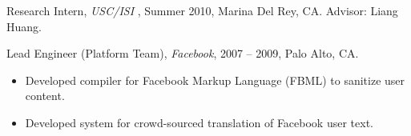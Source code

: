\documentclass[10pt]{article}
\begin{document}
\ind Research Intern, {\sl USC/ISI },  Summer 2010, Marina Del Rey, CA. Advisor: Liang Huang.

\bigskip



\medskip
\ind  Lead Engineer (Platform Team), {\sl Facebook}, 2007 -- 2009, Palo Alto, CA.
\begin{itemize}
\item Developed compiler for Facebook Markup Language (FBML) to sanitize user content.
\item Developed system for crowd-sourced translation of Facebook user text.
\end{itemize}





\bigskip
\end{document}
